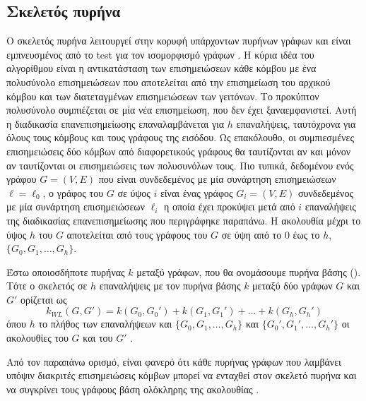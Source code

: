 \subsection{Σκελετός πυρήνα }
\label{ssec:wl}
Ο σκελετός πυρήνα  λειτουργεί στην κορυφή υπάρχοντων πυρήνων γράφων και είναι εμπνευσμένος από το test  για τον ισομορφισμό γράφων \cite{weisfeiler1968reduction}.
Η κύρια ιδέα του αλγορίθμου  είναι η αντικατάσταση των επισημειώσεων κάθε κόμβου με ένα πολυσύνολο επισημειώσεων που αποτελείται από την επισημείωση του αρχικού κόμβου και των διατεταγμένων επισημειώσεων των γειτόνων.
Το προκύπτον πολυσύνολο συμπιέζεται σε μία νέα επισημείωση, που δεν έχει ξαναεμφανιστεί.
Αυτή η διαδικασία επανεπισημείωσης επαναλαμβάνεται για $h$ επαναλήψεις, ταυτόχρονα για όλους τους κόμβους και τους γράφους της εισόδου.
Ως επακόλουθο, οι συμπιεσμένες επισημειώσεις δύο κόμβων από διαφορετικούς γράφους θα ταυτίζονται αν και μόνον αν ταυτίζονται οι επισημειώσεις των πολυσυνόλων τους.
Πιο τυπικά, δεδομένου ενός γράφου $G=(V,E)$ που είναι συνδεδεμένος με μία συνάρτηση επισημειώσεων $\ell=\ell_0$, ο γράφος  του $G$ σε ύψος $i$ είναι ένας γράφος $G_i=(V,E)$ συνδεδεμένος με μία συνάρτηση επισημειώσεων $\ell_i$ η οποία έχει προκύψει μετά από $i$ επαναλήψεις της διαδικασίας επανεπισημείωσης που περιγράφηκε παραπάνω.
Η ακολουθία  μέχρι το ύψος $h$ του $G$ αποτελείται από τους γράφους  του $G$ σε ύψη από το $0$ έως το $h$, $\{ G_0,G_1,\ldots,G_h\}$. 
\begin{definition}
	Έστω οποιοσδήποτε πυρήνας $k$ μεταξύ γράφων, που θα ονομάσουμε πυρήνα βάσης ().
	Τότε ο σκελετός  σε $h$ επαναλήψεις με τον πυρήνα βάσης $k$ μεταξύ δύο γράφων $G$ και $G'$ ορίζεται ως
	\begin{equation}
		k_{WL}(G,G') = k(G_0,G_0') + k(G_1,G_1') + \ldots + k(G_h,G_h')
	\end{equation}
	όπου $h$ το πλήθος των επαναλήψεων  και $\{ G_0,G_1,\ldots,G_h\}$ και $\{ G_0',G_1',\ldots,G_h'\}$ οι ακολουθίες  του $G$ και του $G'$ .
\end{definition}
Από τον παραπάνω ορισμό, είναι φανερό ότι κάθε πυρήνας γράφων που λαμβάνει υπόψιν διακριτές επισημειώσεις κόμβων μπορεί να ενταχθεί στον σκελετό πυρήνα  και να συγκρίνει τους γράφους βάση ολόκληρης της ακολουθίας .\par

